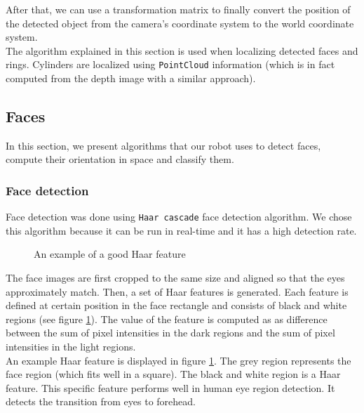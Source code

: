 \documentclass[12pt,a4paper]{article}
\begin{document}
	After that, we can use a transformation matrix to finally convert the position of the detected object from the camera's coordinate system to the world coordinate system. \\ 
	
	The algorithm explained in this section is used when localizing detected faces and rings. Cylinders are localized using \texttt{PointCloud} information (which is in fact computed from the depth image with a similar approach). \\
	
	\subsection{Faces}
	In this section, we present algorithms that our robot uses to detect faces, compute their orientation in space and classify them.
	
	\subsubsection{Face detection} \label{face_detection_algorithm}
	
	Face detection was done using \texttt{Haar cascade} face detection algorithm. We chose this algorithm because it can be run in real-time and it has a high detection rate. \\
	
	\begin{figure}[h]
		\centering
		\caption{An example of a good Haar feature}
		\label{fig:haar_features}
	\end{figure}
	
	The face images are first cropped to the same size and aligned so that the eyes approximately match. Then, a set of Haar features is generated. Each feature is defined at certain position in the face rectangle and consists of black and white regions (see figure \ref{fig:haar_features}). The value of the feature is computed as as difference between the sum of pixel intensities in the dark regions and the sum of pixel intensities in the light regions. \\
	
	An example Haar feature is displayed in figure \ref{fig:haar_features}. The grey region represents the face region (which fits well in a square). The black and white region is a Haar feature. This specific feature performs well in human eye region detection. It detects the transition from eyes to forehead. \\
	
\end{document}
